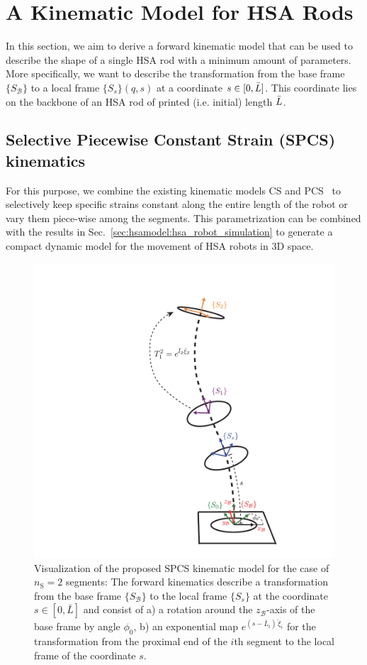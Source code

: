 \section{A Kinematic Model for HSA Rods}\label{sec:hsamodel:hsa_rod_kinematics}
In this section, we aim to derive a forward kinematic model that can be used to describe the shape of a single \gls{HSA} rod with a minimum amount of parameters. More specifically, we want to describe the transformation from the base frame $\{ S_{\mathcal{B}} \}$ to a local frame $\{ S_s \}(q,s)$ at a coordinate $s \in [0, \Bar{L}]$. This coordinate lies on the backbone of an \gls{HSA} rod of printed (i.e. initial) length $\Bar{L}$.

\subsection{Selective Piecewise Constant Strain (SPCS) kinematics}\label{sub:hsamodel:hsa_rod_kinematics:spcs_kinematics}
For this purpose, we combine the existing kinematic models \gls{CS} and \gls{PCS}~\citep{renda2018discrete} to selectively keep specific strains constant along the entire length of the robot or vary them piece-wise among the segments.
This parametrization can be combined with the results in Sec.~\ref{sec:hsamodel:hsa_robot_simulation} to generate a compact dynamic model for the movement of HSA robots in 3D space.
\begin{figure}[htb]
    \centering
    \includegraphics[width=0.25\columnwidth]{hsamodel/figures/kinematics/twisting_kinematics_v2_cropped.pdf}
    \caption{Visualization of the proposed \gls{SPCS} kinematic model for the case of $n_\mathrm{S} = 2$ segments: The forward kinematics describe a transformation from the base frame $\{ S_{\mathcal{B}} \}$ to the local frame $\{ S_s \}$ at the coordinate $s \in [0, \bar{L}]$ and consist of a) a rotation around the $z_{\mathcal{B}}$-axis of the base frame by angle $\phi_0$, b) an exponential map $e^{(s-\bar{L}_i) \, \check{\xi}_i}$ for the transformation from the proximal end of the $i$th segment to the local frame of the coordinate $s$. %
    }
    \label{fig:hsamodel:hsa_kinematics}
\end{figure}

